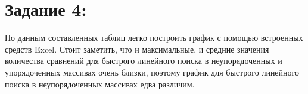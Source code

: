 \documentclass[12pt]{article}
\begin{document}
{	\newpage
	
	\begin{figure}[h]
		\noindent{}
	\end{figure}
	\begin{figure}[h]
		\noindent{}
	\end{figure}


	
	\section{Задание 4:}
	\label{task_4}
	
	По данным составленных таблиц легко построить график с помощью встроенных средств Excel. Стоит заметить, что и максимальные, и средние значения количества сравнений для быстрого линейного поиска в неупорядоченных и упорядоченных массивах очень близки, поэтому график для быстрого линейного поиска в неупорядоченных массивах едва различим.
	
	\newpage
	
}
\end{document}

